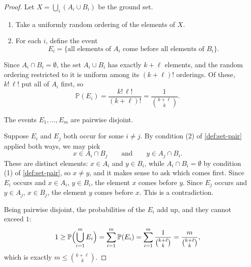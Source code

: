 \begin{proof}
    Let \(X = \bigcup_{i} (A_i \cup B_i)\) be the ground set.
    \begin{enumerate}[(1)]
        \item Take a uniformly random ordering of the elements of \(X\).
        \item For each \(i\), define the event
        \[
            E_i = \{\text{all elements of } A_i \text{ come before all elements of } B_i\}.
        \]
    \end{enumerate}
    Since \(A_i \cap B_i = \emptyset\), the set \(A_i \cup B_i\) has exactly \(k + \ell\) elements, and the random ordering restricted to it is uniform among its \((k+\ell)!\) orderings. Of these, \(k! \, \ell!\) put all of \(A_i\) first, so
    \[
        \mathbb{P}(E_i) = \frac{k! \, \ell!}{(k+\ell)!} = \frac{1}{\binom{k+\ell}{k}}.
    \]

    \begin{claim}
        The events \(E_1, \ldots, E_m\) are pairwise disjoint.
    \end{claim}
    \begin{subproof}
        Suppose \(E_i\) and \(E_j\) both occur for some \(i \ne j\). By condition (2) of \autoref{def:set-pair} applied both ways, we may pick
        \[
            x \in A_i \cap B_j \qquad \text{and} \qquad y \in A_j \cap B_i.
        \]
        These are distinct elements: \(x \in A_i\) and \(y \in B_i\), while \(A_i \cap B_i = \emptyset\) by condition (1) of \autoref{def:set-pair}, so \(x \ne y\), and it makes sense to ask which comes first. Since \(E_i\) occurs and \(x \in A_i\), \(y \in B_i\), the element \(x\) comes before \(y\). Since \(E_j\) occurs and \(y \in A_j\), \(x \in B_j\), the element \(y\) comes before \(x\). This is a contradiction.
        \begin{center}
        \end{center}
    \end{subproof}
    Being pairwise disjoint, the probabilities of the \(E_i\) add up, and they cannot exceed \(1\):
    \[
        1 \ge \mathbb{P}\Bigl( \bigcup_{i=1}^{m} E_i \Bigr) = \sum_{i=1}^{m} \mathbb{P}(E_i) = \sum_{i=1}^{m} \frac{1}{\binom{k+\ell}{k}} = \frac{m}{\binom{k+\ell}{k}},
    \]
    which is exactly \(m \le \binom{k+\ell}{k}\).
\end{proof}

